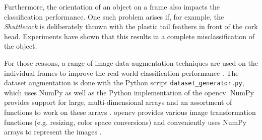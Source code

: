 Furthermore, the orientation of an object on a frame also impacts the classification performance.
One such problem arises if, for example, the \textit{Shuttlecock} is deliberately thrown with the plastic tail feathers in front of the cork head.
Experiments have shown that this results in a complete misclassification of the object.

For those reasons, a range of image data augmentation techniques are used on the individual frames to improve the real-world classification performance \cite{training_data_augmentation}.
The dataset augmentation is done with the Python script \texttt{dataset\_generator.py}, which uses NumPy as well as the Python implementation of the \acrfull{opencv}.
NumPy provides support for large, multi-dimensional arrays and an assortment of functions to work on these arrays \cite{training_numpy}.
\acrshort{opencv} provides various image transformation functions (e.g. resizing, color space conversions) and conveniently uses NumPy arrays to represent the images \cite{training_opencv_intro}.

